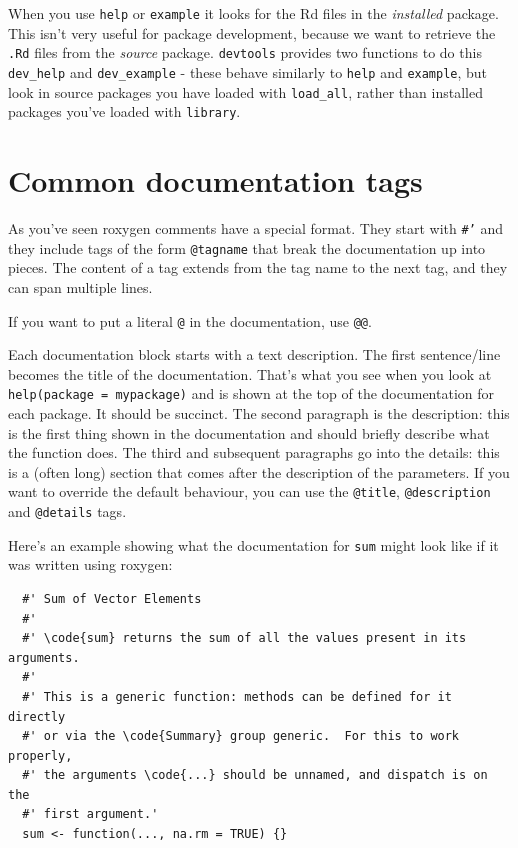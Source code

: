 When you use \texttt{help} or \texttt{example} it looks for the Rd files
in the \emph{installed} package. This isn't very useful for package
development, because we want to retrieve the \texttt{.Rd} files from the
\emph{source} package. \texttt{devtools} provides two functions to do
this \texttt{dev\_help} and \texttt{dev\_example} - these behave
similarly to \texttt{help} and \texttt{example}, but look in source
packages you have loaded with \texttt{load\_all}, rather than installed
packages you've loaded with \texttt{library}.

\section{Common documentation tags}

As you've seen roxygen comments have a special format. They start with
\texttt{\#'} and they include tags of the form \texttt{@tagname} that
break the documentation up into pieces. The content of a tag extends
from the tag name to the next tag, and they can span multiple lines.

If you want to put a literal \texttt{@} in the documentation, use
\texttt{@@}.

Each documentation block starts with a text description. The first
sentence/line becomes the title of the documentation. That's what you
see when you look at \texttt{help(package = mypackage)} and is shown at
the top of the documentation for each package. It should be succinct.
The second paragraph is the description: this is the first thing shown
in the documentation and should briefly describe what the function does.
The third and subsequent paragraphs go into the details: this is a
(often long) section that comes after the description of the parameters.
If you want to override the default behaviour, you can use the
\texttt{@title}, \texttt{@description} and \texttt{@details} tags.

Here's an example showing what the documentation for \texttt{sum} might
look like if it was written using roxygen:

\begin{verbatim}
  #' Sum of Vector Elements
  #'
  #' \code{sum} returns the sum of all the values present in its arguments.
  #'
  #' This is a generic function: methods can be defined for it directly
  #' or via the \code{Summary} group generic.  For this to work properly,
  #' the arguments \code{...} should be unnamed, and dispatch is on the
  #' first argument.'
  sum <- function(..., na.rm = TRUE) {}
\end{verbatim}

